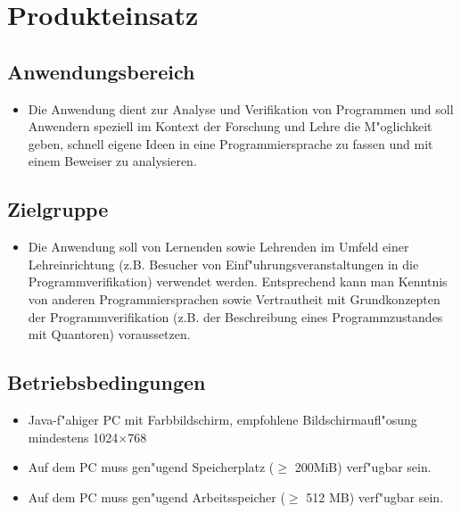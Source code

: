 \section{Produkteinsatz}%

\subsection{Anwendungsbereich}%

\begin{itemize}%
    \item Die Anwendung dient zur Analyse und \see Verifikation von Programmen und soll Anwendern speziell im Kontext der Forschung und Lehre die M"oglichkeit geben, schnell eigene Ideen in eine Programmiersprache zu fassen und mit einem \see Beweiser zu analysieren.%
\end{itemize}%

\subsection{Zielgruppe}%

\begin{itemize}%
    \item Die Anwendung soll von Lernenden sowie Lehrenden im Umfeld einer Lehreinrichtung (z.B. Besucher von Einf"uhrungsveranstaltungen in die Programmverifikation) verwendet werden. Entsprechend kann man Kenntnis von anderen Programmiersprachen sowie Vertrautheit mit Grundkonzepten der Programmverifikation (z.B. der Beschreibung eines \see Programmzustandes mit \see Quantoren) voraussetzen.%
\end{itemize}%

\subsection{Betriebsbedingungen}%

\begin{itemize}%
    \item \see Java-f"ahiger PC mit Farbbildschirm, empfohlene Bildschirmaufl"osung mindestens 1024$\times$768%
    \item Auf dem PC muss gen"ugend Speicherplatz ($\ge$ 200MiB) verf"ugbar sein.%
    \item Auf dem PC muss gen"ugend Arbeitsspeicher ($\ge$ 512 MB) verf"ugbar sein.%
\end{itemize}%
